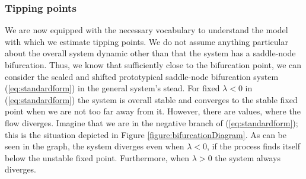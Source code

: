 \subsubsection{Tipping points}
We are now equipped with the necessary vocabulary to understand the model with which we estimate tipping points. We do not assume anything particular about the overall system dynamic other than that the system has a saddle-node bifurcation. Thus, we know that sufficiently close to the bifurcation point, we can consider the scaled and shifted prototypical saddle-node bifurcation system (\ref{eq:standardform}) in the general system's stead. For fixed $\lambda < 0$ in (\ref{eq:standardform}) the system is overall stable and converges to the stable fixed point when we are not too far away from it. However, there are values, where the flow  diverges. Imagine that we are in the negative branch of (\ref{eq:standardform}); this is the situation depicted in Figure \ref{figure:bifurcationDiagram}. As can be seen in the graph, the system diverges even when $\lambda<0$, if the process finds itself below the unstable fixed point. Furthermore, when $\lambda>0$ the system always diverges.

